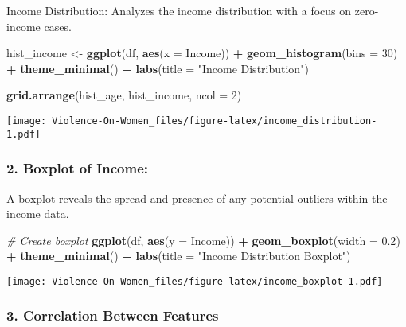 \documentclass[
]{article}
\newenvironment{Shaded}{\begin{snugshade}}{\end{snugshade}}
\newcommand{\AttributeTok}[1]{\textcolor[rgb]{0.13,0.29,0.53}{#1}}
\newcommand{\CommentTok}[1]{\textcolor[rgb]{0.56,0.35,0.01}{\textit{#1}}}
\newcommand{\DecValTok}[1]{\textcolor[rgb]{0.00,0.00,0.81}{#1}}
\newcommand{\FloatTok}[1]{\textcolor[rgb]{0.00,0.00,0.81}{#1}}
\newcommand{\FunctionTok}[1]{\textcolor[rgb]{0.13,0.29,0.53}{\textbf{#1}}}
\newcommand{\NormalTok}[1]{#1}
\newcommand{\OtherTok}[1]{\textcolor[rgb]{0.56,0.35,0.01}{#1}}
\newcommand{\SpecialCharTok}[1]{\textcolor[rgb]{0.81,0.36,0.00}{\textbf{#1}}}
\newcommand{\StringTok}[1]{\textcolor[rgb]{0.31,0.60,0.02}{#1}}
\begin{document}
Income Distribution: Analyzes the income distribution with a focus on
zero-income cases.

\begin{Shaded}
\begin{Highlighting}[]
\NormalTok{hist\_income }\OtherTok{\textless{}{-}} \FunctionTok{ggplot}\NormalTok{(df, }\FunctionTok{aes}\NormalTok{(}\AttributeTok{x =}\NormalTok{ Income)) }\SpecialCharTok{+}
  \FunctionTok{geom\_histogram}\NormalTok{(}\AttributeTok{bins =} \DecValTok{30}\NormalTok{) }\SpecialCharTok{+}
  \FunctionTok{theme\_minimal}\NormalTok{() }\SpecialCharTok{+}
  \FunctionTok{labs}\NormalTok{(}\AttributeTok{title =} \StringTok{"Income Distribution"}\NormalTok{)}

\FunctionTok{grid.arrange}\NormalTok{(hist\_age, hist\_income, }\AttributeTok{ncol =} \DecValTok{2}\NormalTok{)}
\end{Highlighting}
\end{Shaded}

\texttt{[image: Violence-On-Women\_files/figure-latex/income\_distribution-1.pdf]}

\hypertarget{boxplot-of-income}{%
\subsubsection{2. Boxplot of Income:}\label{boxplot-of-income}}

A boxplot reveals the spread and presence of any potential outliers
within the income data.

\begin{Shaded}
\begin{Highlighting}[]
\CommentTok{\# Create boxplot}
\FunctionTok{ggplot}\NormalTok{(df, }\FunctionTok{aes}\NormalTok{(}\AttributeTok{y =}\NormalTok{ Income)) }\SpecialCharTok{+}
  \FunctionTok{geom\_boxplot}\NormalTok{(}\AttributeTok{width =} \FloatTok{0.2}\NormalTok{) }\SpecialCharTok{+}
  \FunctionTok{theme\_minimal}\NormalTok{() }\SpecialCharTok{+}
  \FunctionTok{labs}\NormalTok{(}\AttributeTok{title =} \StringTok{"Income Distribution Boxplot"}\NormalTok{)}
\end{Highlighting}
\end{Shaded}

\texttt{[image: Violence-On-Women\_files/figure-latex/income\_boxplot-1.pdf]}

\hypertarget{correlation-between-features}{%
\subsubsection{3. Correlation Between
Features}\label{correlation-between-features}}
\end{document}
